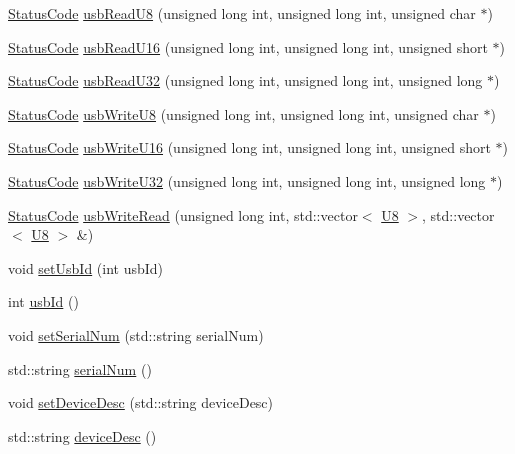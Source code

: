 \begin{DoxyCompactItemize}
\item 
\hyperlink{classStatusCode}{StatusCode} \hyperlink{classUsbFTInterface_ab0803dd4c3ce3bf26dff4f4145b34546}{usbReadU8} (unsigned long int, unsigned long int, unsigned char $\ast$)
\item 
\hyperlink{classStatusCode}{StatusCode} \hyperlink{classUsbFTInterface_ae17381a2ca14b9acac9faa10c3e430db}{usbReadU16} (unsigned long int, unsigned long int, unsigned short $\ast$)
\item 
\hyperlink{classStatusCode}{StatusCode} \hyperlink{classUsbFTInterface_a7eadb8a94323fada4c72ed1c992792cc}{usbReadU32} (unsigned long int, unsigned long int, unsigned long $\ast$)
\item 
\hyperlink{classStatusCode}{StatusCode} \hyperlink{classUsbFTInterface_a8aeebce6a10aa88c19cfa663b47b389a}{usbWriteU8} (unsigned long int, unsigned long int, unsigned char $\ast$)
\item 
\hyperlink{classStatusCode}{StatusCode} \hyperlink{classUsbFTInterface_aa37ff87bb675d1671ee7a92ee83500b9}{usbWriteU16} (unsigned long int, unsigned long int, unsigned short $\ast$)
\item 
\hyperlink{classStatusCode}{StatusCode} \hyperlink{classUsbFTInterface_ac5eac42e444c9b0f19f0f70598c51b20}{usbWriteU32} (unsigned long int, unsigned long int, unsigned long $\ast$)
\item 
\hyperlink{classStatusCode}{StatusCode} \hyperlink{classUsbFTInterface_aa477927996bd05aeee185c192ef9a68e}{usbWriteRead} (unsigned long int, std::vector$<$ \hyperlink{classUsbFTInterface_a3b007566f8af758984d97ada2b9938d3}{U8} $>$, std::vector$<$ \hyperlink{classUsbFTInterface_a3b007566f8af758984d97ada2b9938d3}{U8} $>$ \&)
\item 
void \hyperlink{classUsbFTInterface_a6718c98c2b6d5924b6722e81f93f25f0}{setUsbId} (int usbId)
\item 
int \hyperlink{classUsbFTInterface_a2a63b462eb5831b4aef9d0f4c8d6ee1a}{usbId} ()
\item 
void \hyperlink{classUsbFTInterface_aaabe44c3b717a98e7571de296085c3a4}{setSerialNum} (std::string serialNum)
\item 
std::string \hyperlink{classUsbFTInterface_ab4a2aa9664e903c57ae396faf643e7a3}{serialNum} ()
\item 
void \hyperlink{classUsbFTInterface_abb106a3d2c48826f96ec2ac10d029132}{setDeviceDesc} (std::string deviceDesc)
\item 
std::string \hyperlink{classUsbFTInterface_af353796fd68a869ea5c8e753aa65dc2c}{deviceDesc} ()
\item 

\end{DoxyCompactItemize}
